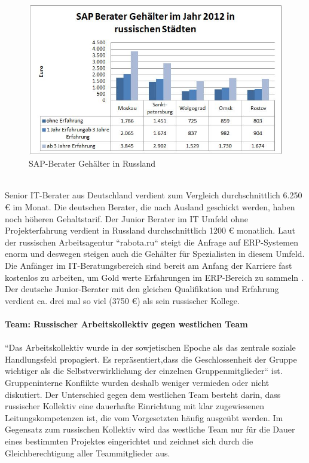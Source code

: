 	\\
\begin{figure}[htp]
\centering
\includegraphics[width=0.7\linewidth]{./images/SAP-Berater_Gehalt_RU}
\caption{SAP-Berater Gehälter in Russland}
\label{fig:SAP-Berater_Gehalt_RU}
\end{figure}
\\
	Senior IT-Berater aus Deutschland verdient zum Vergleich durchschnittlich 6.250 € im Monat\cite{GehaltSAPBerDE}. Die deutschen Berater, die nach Ausland geschickt werden, haben noch höheren Gehaltstarif. Der Junior Berater im IT Umfeld ohne Projekterfahrung  verdient in Russland durchschnittlich 1200 € monatlich\cite{GehaltSAPBerRU}. Laut der russischen Arbeitsagentur ``rabota.ru`` steigt die Anfrage auf ERP-Systemen enorm und deswegen steigen auch die Gehälter für Spezialisten in diesem Umfeld. Die Anfänger im IT-Beratungsbereich sind bereit am Anfang der Karriere fast kostenlos zu arbeiten, um Gold werte  Erfahrungen im ERP-Bereich zu sammeln \cite{RusGehRabota}.
	Der deutsche Junior-Berater mit den gleichen Qualifikation und Erfahrung verdient ca. drei mal so viel (3750 €) \cite{GehaltSAPBerDE} als sein russischer Kollege.\\
	\\
	 \newpage
	\textbf{Team: %
	Russischer Arbeitskollektiv gegen westlichen Team}\\
	\\
	``Das Arbeitskollektiv wurde in der sowjetischen 
	Epoche als das zentrale soziale Handlungsfeld propagiert. Es repräsentiert,dass die Geschlossenheit der Gruppe wichtiger als die Selbstverwirklichung der einzelnen Gruppenmitglieder`` ist.\cite{ProzessbeglBerRU}\\
	Gruppeninterne Konflikte wurden deshalb weniger vermieden oder nicht diskutiert. Der Unterschied gegen dem westlichen Team besteht darin, dass russischer Kollektiv eine dauerhafte Einrichtung mit klar zugewiesenen Leitungskompetenzen ist, die vom Vorgesetzten häufig ausgeübt werden. Im Gegensatz zum russischen Kollektiv wird das westliche Team nur für die Dauer eines bestimmten Projektes eingerichtet und zeichnet sich durch die Gleichberechtigung aller Teammitglieder aus.\\
